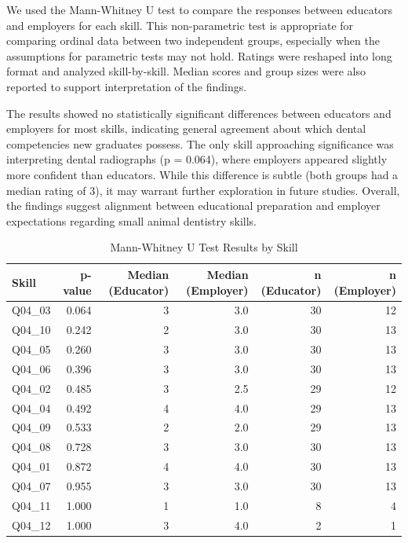 \documentclass[
  11pt,
  letterpaper,
  DIV=11,
  numbers=noendperiod]{scrartcl}
\numberwithin{figure}{section}
\begin{document}
We used the Mann-Whitney U test to compare the responses between
educators and employers for each skill. This non-parametric test is
appropriate for comparing ordinal data between two independent groups,
especially when the assumptions for parametric tests may not hold.
Ratings were reshaped into long format and analyzed skill-by-skill.
Median scores and group sizes were also reported to support
interpretation of the findings.

The results showed no statistically significant differences between
educators and employers for most skills, indicating general agreement
about which dental competencies new graduates possess. The only skill
approaching significance was interpreting dental radiographs (p =
0.064), where employers appeared slightly more confident than educators.
While this difference is subtle (both groups had a median rating of 3),
it may warrant further exploration in future studies. Overall, the
findings suggest alignment between educational preparation and employer
expectations regarding small animal dentistry skills.

\begin{table}
\caption*{
{\large Mann-Whitney U Test Results by Skill}
} 
\fontsize{12.0pt}{14.4pt}\selectfont
\begin{tabular*}{\linewidth}{@{\extracolsep{\fill}}lrrrrr}
\toprule
Skill & p-value & Median (Educator) & Median (Employer) & n (Educator) & n (Employer) \\ 
\midrule\addlinespace[2.5pt]
Q04\_03 & 0.064 & 3 & 3.0 & 30 & 12 \\ 
Q04\_10 & 0.242 & 2 & 3.0 & 30 & 13 \\ 
Q04\_05 & 0.260 & 3 & 3.0 & 30 & 13 \\ 
Q04\_06 & 0.396 & 3 & 3.0 & 30 & 13 \\ 
Q04\_02 & 0.485 & 3 & 2.5 & 29 & 12 \\ 
Q04\_04 & 0.492 & 4 & 4.0 & 29 & 13 \\ 
Q04\_09 & 0.533 & 2 & 2.0 & 29 & 13 \\ 
Q04\_08 & 0.728 & 3 & 3.0 & 30 & 13 \\ 
Q04\_01 & 0.872 & 4 & 4.0 & 30 & 13 \\ 
Q04\_07 & 0.955 & 3 & 3.0 & 30 & 13 \\ 
Q04\_11 & 1.000 & 1 & 1.0 & 8 & 4 \\ 
Q04\_12 & 1.000 & 3 & 4.0 & 2 & 1 \\ 
\bottomrule
\end{tabular*}
\end{table}
\end{document}
